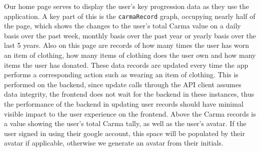 \documentclass[a4paper, 11pt]{article}
\begin{document}
        Our home page serves to display the user's key progression data as they
        use the application. A key part of this is the \texttt{carmaRecord}
        graph, occupying nearly half of the page, which shows the changes to the
        user's total Carma value on a daily basis over the past week, monthly
        basis over the past year or yearly basis over the last 5 years.
        \newline\newline
        Also on this page are records of how many times the user has worn an
        item  of clothing, how many items of clothing does the user own and how
        many items the user has donated. These data records are updated every
        time the app performs a corresponding action such as wearing an item of
        clothing. This is performed on the backend, since update calls through
        the API client assumes data integrity, the frontend does not wait for
        the backend in these instances, thus the performance of the backend in
        updating user records should have minimal visible impact to the user
        experience on the frontend.
        \newline\newline
        Above the Carma records is a value showing the user's total Carma tally,
        as well as the user's avatar. If the user signed in using their google
        account, this space will be populated by their avatar if applicable,
        otherwise we generate an avatar from their initials.
        \newline\newline
\end{document}
